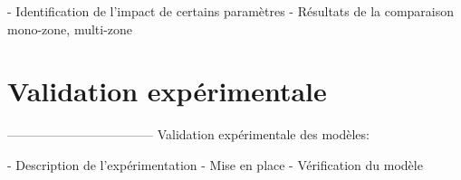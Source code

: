  - Identification de l’impact de certains paramètres
 - Résultats de la comparaison mono-zone, multi-zone



\section{Validation expérimentale} %
\label{sec:validation_experimentale}
-----------------------------------
Validation expérimentale des modèles:

 - Description de l’expérimentation
 - Mise en place
 - Vérification du modèle
